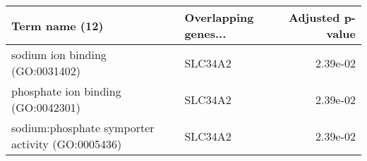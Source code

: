 \begin{tabular}{llr}
\toprule
                                  Term name (12) & Overlapping genes... &  Adjusted p-value \\
\midrule
                 sodium ion binding (GO:0031402) &              SLC34A2 &          2.39e-02 \\
              phosphate ion binding (GO:0042301) &              SLC34A2 &          2.39e-02 \\
sodium:phosphate symporter activity (GO:0005436) &              SLC34A2 &          2.39e-02 \\
\bottomrule
\end{tabular}
